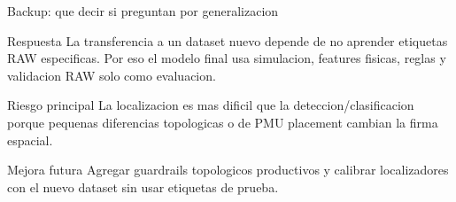 \documentclass[10pt,aspectratio=169]{beamer}
\begin{document}
\begin{frame}{Backup: que decir si preguntan por generalizacion}
\small
\begin{block}{Respuesta}
La transferencia a un dataset nuevo depende de no aprender etiquetas RAW especificas. Por eso el modelo final usa simulacion, features fisicas, reglas y validacion RAW solo como evaluacion.
\end{block}
\begin{alertblock}{Riesgo principal}
La localizacion es mas dificil que la deteccion/clasificacion porque pequenas diferencias topologicas o de PMU placement cambian la firma espacial.
\end{alertblock}
\begin{exampleblock}{Mejora futura}
Agregar guardrails topologicos productivos y calibrar localizadores con el nuevo dataset sin usar etiquetas de prueba.
\end{exampleblock}
\end{frame}
\end{document}
